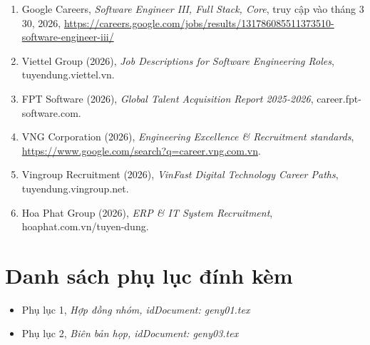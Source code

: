 \documentclass[12pt,a4paper]{article}
\begin{document}
\begin{sloppypar}
\begin{enumerate}
    \item Google Careers, \textit{Software Engineer III, Full Stack, Core}, truy cập vào tháng 3 30, 2026, \url{https://careers.google.com/jobs/results/131786085511373510-software-engineer-iii/}
    \item Viettel Group (2026), \textit{Job Descriptions for Software Engineering Roles}, tuyendung.viettel.vn.
    \item FPT Software (2026), \textit{Global Talent Acquisition Report 2025-2026}, career.fpt-software.com.
    \item VNG Corporation (2026), \textit{Engineering Excellence \& Recruitment standards}, \url{https://www.google.com/search?q=career.vng.com.vn}.
    \item Vingroup Recruitment (2026), \textit{VinFast Digital Technology Career Paths}, tuyendung.vingroup.net.
    \item Hoa Phat Group (2026), \textit{ERP \& IT System Recruitment}, hoaphat.com.vn/tuyen-dung.
\end{enumerate}
\end{sloppypar}

\section{Danh sách phụ lục đính kèm}
\begin{itemize}
    \item Phụ lục 1, \textit{Hợp đồng nhóm, idDocument: geny01.tex} 
    \item Phụ lục 2, \textit{Biên bản họp, idDocument: geny03.tex} 
\end{itemize}

\label{LastPageMain} 



\clearpage 
{} 
{}

\setcounter{secnumdepth}{-1} 
\hypersetup{bookmarksdepth=-1} 

\onehalfspacing 
\setcounter{page}{1} %

\label{LastPageGeny01} %
\end{document}
